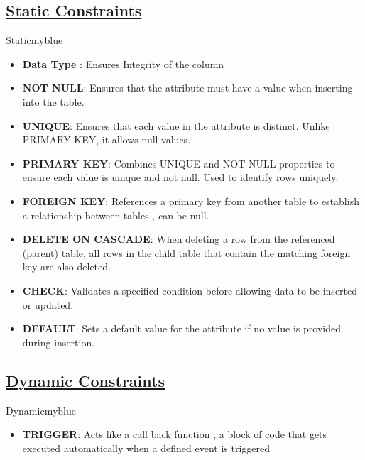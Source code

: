 \subsection{\underline{Static Constraints}}

\vspace{0.25cm}
\begin{prettyBox}{Static}{myblue}
\begin{itemize} 
\item \textbf{Data Type} : Ensures Integrity of the column
\item \textbf{NOT NULL}: Ensures that the attribute must have a value when inserting into the table.
\item \textbf{UNIQUE}: Ensures that each value in the attribute is distinct. Unlike PRIMARY KEY, it allows null values.
\item \textbf{PRIMARY KEY}: Combines UNIQUE and NOT NULL properties to ensure each value is unique and not null.
Used to identify rows uniquely. 
\item \textbf{FOREIGN KEY}: References a primary key from another table to establish a relationship between tables , can be null.
\item \textbf{DELETE ON CASCADE}: When deleting a row from the referenced (parent) table, all rows in the child table 
that contain the matching foreign key are also deleted.
\item \textbf{CHECK}: Validates a specified condition before allowing data to be inserted or updated. 
\item \textbf{DEFAULT}: Sets a default value for the attribute if no value is provided during insertion. 
\end{itemize}
\end{prettyBox}

\vspace{0.5cm}
\subsection{\underline{Dynamic Constraints}} 

\vspace{0.25cm}
\begin{prettyBox}{Dynamic}{myblue}
\begin{itemize} 
\item \textbf{TRIGGER}: Acts like a call back function , a block of code that gets executed automatically when 
a defined event is triggered
\end{itemize}
\end{prettyBox}

